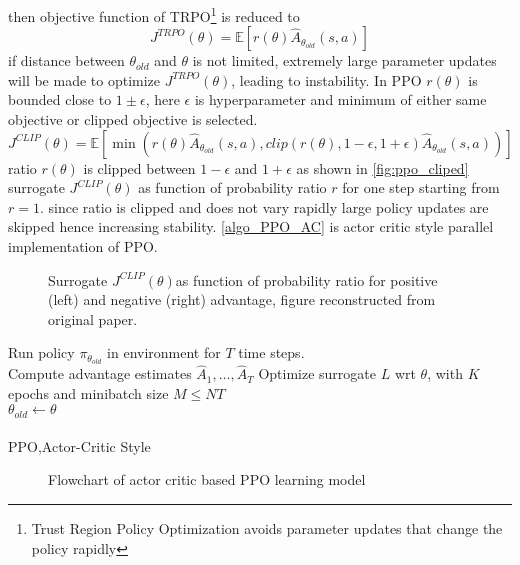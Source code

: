 \noindent then objective function of TRPO\footnote{Trust Region Policy Optimization\cite{schulman2015trust} avoids parameter updates that change the policy rapidly} is reduced to
\begin{equation}
J^{TRPO} (\theta )=\mathbb{E}[ r(\theta )\hat{A}_{\theta _{old}} (s,a)]
\end{equation}
if distance between $\displaystyle \theta _{old}$ and $\displaystyle \theta $ is not limited, extremely large parameter updates will be made to optimize $\displaystyle J^{TRPO}( \theta )$, leading to instability. In PPO $\displaystyle r( \theta )$ is bounded close to $\displaystyle 1\pm \epsilon $, here $\displaystyle \epsilon $ is hyperparameter and minimum of either same objective or clipped objective is selected.
\begin{equation}
J^{CLIP} (\theta )=\mathbb{E} [\min (r(\theta )\hat{A}_{\theta _{old}} (s,a),clip(r(\theta ),1-\epsilon ,1+\epsilon )\hat{A}_{\theta _{old}} (s,a))]
\end{equation}
ratio $\displaystyle r( \theta )$ is clipped between $\displaystyle 1-\epsilon $ and $\displaystyle 1+\epsilon $ as shown in \autoref{fig:ppo_cliped} surrogate $J^{CLIP}(\theta)$ as function of probability ratio $r$ for one step starting from $r=1$. since ratio is clipped and does not vary rapidly large policy updates are skipped hence increasing stability. \autoref{algo_PPO_AC} is actor critic style parallel implementation of PPO.

\begin{figure}[H]
    \centering
        \caption{Surrogate $J^{CLIP}(\theta)$as function of probability ratio for positive (left) and negative (right) advantage, figure reconstructed from original paper. \cite{schulman2017proximal}}
    \label{fig:ppo_cliped}
\end{figure}


\begin{algorithm}[H]
\SetAlgoLined
{}
 {
 {
Run policy $\displaystyle \pi_{\theta_{old}}$ in environment for $T$ time steps.\\
Compute advantage estimates $\hat{A}_1,\dots,\hat{A}_T$
}
Optimize surrogate $L$ wrt $\theta$, with $K$ epochs and minibatch size $M \leq NT$ \\
$\theta_{old} \xleftarrow[]{} \theta$
}
 \caption{PPO,Actor-Critic Style}
    \label{algo_PPO_AC}
\end{algorithm}
\begin{figure}[H]
    \centering
    \scalebox{0.75}{}
    \caption{Flowchart of actor critic based PPO learning model \cite{LimHun_ppo_flowchart}}
    \label{fig:ppo_flowchart}
\end{figure}
